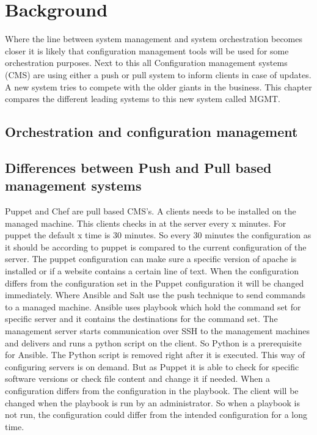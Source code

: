 \section{Background}\label{sec:background}
Where the line between system management and system orchestration becomes closer it is likely that configuration management tools will be used for some orchestration purposes. Next to this all Configuration management systems (CMS) are using either a push or pull system to inform clients in case of updates. A new system tries to compete with the older giants in the business. This chapter compares the different leading systems to this new system called MGMT.

\subsection{Orchestration and configuration management}\label{subsec:orchestration}


\subsection{Differences between Push and Pull based management systems}\label{subsec:pushpull}
Puppet and Chef are pull based CMS's. A clients needs to be installed on the managed machine. This clients checks in at the server every x minutes. For puppet the default x time is 30 minutes. So every 30 minutes the configuration as it should be according to puppet is compared to the current configuration of the server. The puppet configuration can make sure a specific version of apache is installed or if a website contains a certain line of text. When the configuration differs from the configuration set in the Puppet configuration it will be changed immediately. Where Ansible and Salt use the push technique to send commands to a managed machine. Ansible uses playbook which hold the command set for specific server and it contains the destinations for the command set. The management server starts communication over SSH to the management machines and delivers and runs a python script on the client. So Python is a prerequisite for Ansible. The Python script is removed right after it is executed. This way of configuring servers is on demand. But as Puppet it is able to check for specific software versions or check file content and change it if needed. When a configuration differs from the configuration in the playbook. The client will be changed when the playbook is run by an administrator. So when a playbook is not run, the configuration could differ from the intended configuration for a long time. 

